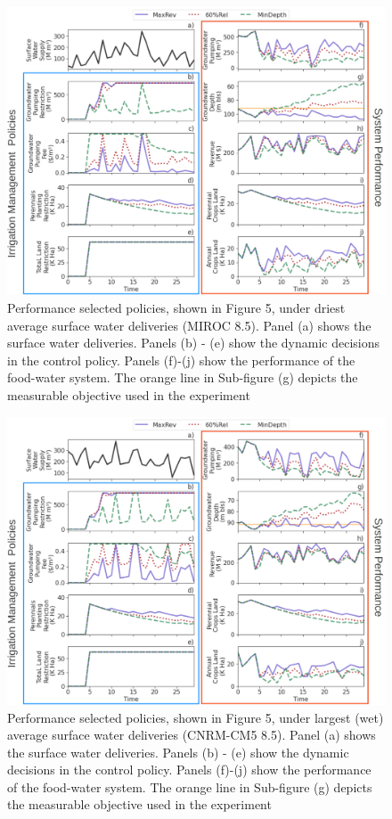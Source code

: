 \documentclass[11pt,a4paper]{article}
\begin{document}
\begin{figure}[H]
    \centering
    \includegraphics[width=1\textwidth]{./figs/selected_dry_performance.png}
    \caption{Performance selected policies, shown in Figure 5, under driest average surface water deliveries (MIROC 8.5). Panel (a) shows the surface water deliveries. Panels (b) - (e) show the dynamic decisions in the control policy. Panels (f)-(j) show the performance of the food-water system. The orange line in Sub-figure (g) depicts the measurable objective used in the experiment}
    \label{fig:m1esh1}
\end{figure}



\begin{figure}[H]
    \centering
    \includegraphics[width=1\textwidth]{./figs/selected_wet_performance.png}
    \caption{Performance selected policies, shown in Figure 5, under largest (wet) average surface water deliveries (CNRM-CM5 8.5). Panel (a) shows the surface water deliveries. Panels (b) - (e) show the dynamic decisions in the control policy. Panels (f)-(j) show the performance of the food-water system. The orange line in Sub-figure (g) depicts the measurable objective used in the experiment}
    \label{fig:m1esh1}
\end{figure}
\end{document}
